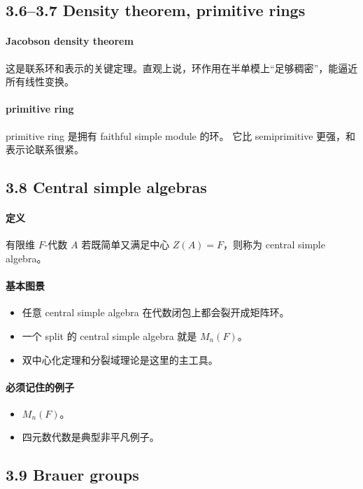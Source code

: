 \documentclass[a4paper]{ctexart}
\begin{document}
\subsection{3.6--3.7 Density theorem, primitive rings}

\paragraph{Jacobson density theorem}
这是联系环和表示的关键定理。直观上说，环作用在半单模上“足够稠密”，能逼近所有线性变换。

\paragraph{primitive ring}
primitive ring 是拥有 faithful simple module 的环。
它比 semiprimitive 更强，和表示论联系很紧。

\subsection{3.8 Central simple algebras}

\paragraph{定义}
有限维 \(F\)-代数 \(A\) 若既简单又满足中心 \(Z(A)=F\)，则称为 central simple algebra。

\paragraph{基本图景}
\begin{itemize}
  \item 任意 central simple algebra 在代数闭包上都会裂开成矩阵环。
  \item 一个 split 的 central simple algebra 就是 \(M_n(F)\)。
  \item 双中心化定理和分裂域理论是这里的主工具。
\end{itemize}

\paragraph{必须记住的例子}
\begin{itemize}
  \item \(M_n(F)\)。
  \item 四元数代数是典型非平凡例子。
\end{itemize}

\subsection{3.9 Brauer groups}
\end{document}
